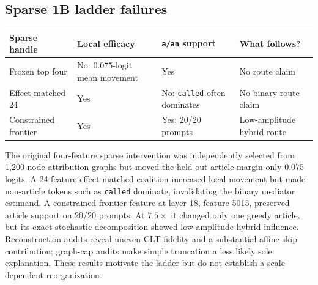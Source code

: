 \documentclass[
]{article}
\newcounter{none} %
\begin{document}
\subsection{Sparse 1B ladder failures}\label{sparse-1b-ladder-failures}

{\def\LTcaptype{none} %
\begin{longtable}[]{@{}
  >{\raggedright\arraybackslash}p{}
  >{\raggedleft\arraybackslash}p{}
  >{\raggedleft\arraybackslash}p{}
  >{\raggedright\arraybackslash}p{}@{}}
\toprule\noalign{}
\begin{minipage}[b]{\linewidth}\raggedright
Sparse handle
\end{minipage} & \begin{minipage}[b]{\linewidth}\raggedleft
Local efficacy
\end{minipage} & \begin{minipage}[b]{\linewidth}\raggedleft
\texttt{a/an} support
\end{minipage} & \begin{minipage}[b]{\linewidth}\raggedright
What follows?
\end{minipage} \\
\midrule\noalign{}
\endhead
\bottomrule\noalign{}
\endlastfoot
Frozen top four & No: 0.075-logit mean movement & Yes & No route
claim \\
Effect-matched 24 & Yes & No: \texttt{called} often dominates & No
binary route claim \\
Constrained frontier & Yes & Yes: 20/20 prompts & Low-amplitude hybrid
route \\
\end{longtable}
}

The original four-feature sparse intervention was independently selected
from 1,200-node attribution graphs but moved the held-out article margin
only 0.075 logits. A 24-feature effect-matched coalition increased local
movement but made non-article tokens such as \texttt{called} dominate,
invalidating the binary mediator estimand. A constrained frontier
feature at layer 18, feature 5015, preserved article support on 20/20
prompts. At \(7.5\times\) it changed only one greedy article, but its
exact stochastic decomposition showed low-amplitude hybrid influence.
Reconstruction audits reveal uneven CLT fidelity and a substantial
affine-skip contribution; graph-cap audits make simple truncation a less
likely sole explanation. These results motivate the ladder but do not
establish a scale-dependent reorganization.
\end{document}
